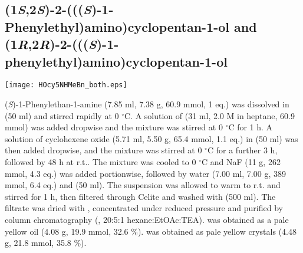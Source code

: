 \subsection{(1\textit{S},2\textit{S})\hyp{}2\hyp{}(((\allowbreak \textit{S})\hyp{}1\hyp{}Phenylethyl)am\allowbreak ino)cyclopentan\hyp{}1\hyp{}ol  and (1\textit{R},2\textit{R})\hyp{}2\hyp{}(((\allowbreak \textit{S})\hyp{}1\hyp{}phenylethyl)amino)\allowbreak cyclopentan\hyp{}1\hyp{}ol }


\begin{scheme}[H]
	\begin{center}
		\texttt{[image: HOcy5NHMeBn\_both.eps]}
	\end{center}
\end{scheme}
(\textit{S})-1-Phenylethan-1-amine  (7.85 ml, 7.38 g, 60.9 mmol, 1 eq.) was dissolved in  (50 ml) and stirred rapidly at 0 $^\circ$C. A solution of  (31 ml, 2.0 M in heptane, 60.9 mmol) was added dropwise and the mixture was stirred at 0 $^\circ$C for 1 h. A solution of cyclohexene oxide  (5.71 ml, 5.50 g, 65.4 mmol, 1.1 eq.) in  (50 ml) was then added dropwise, and the mixture was stirred at 0 $^\circ$C for a further 3 h, followed by 48 h at r.t.. The mixture was cooled  to 0 $^\circ$C and NaF (11 g, 262 mmol, 4.3 eq.) was added portionwise, followed by water (7.00 ml, 7.00 g, 389 mmol, 6.4 eq.) and  (50 ml). The suspension was allowed to warm to r.t. and stirred for 1 h, then filtered through Celite and washed with  (500 ml). The filtrate was dried with , concentrated under reduced pressure and purified by column chromatography (, 20:5:1 hexane:EtOAc:TEA).  was obtained as a pale yellow oil (4.08 g, 19.9 mmol, 32.6 \%).  was obtained as pale yellow crystals (4.48 g, 21.8 mmol, 35.8 \%).



